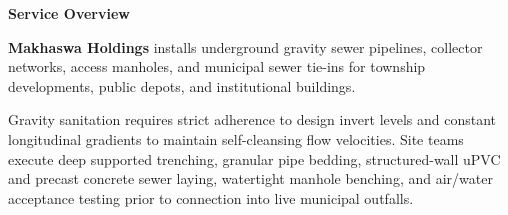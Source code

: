 \documentclass[a4paper,11pt]{article}
\begin{document}
\noindent
\begin{minipage}[t]{0.63\textwidth}
    \vspace{0pt}
    {\large\bfseries\color{mhnavy} Service Overview}
    \vspace{0.08cm}

    {\fontsize{8.7pt}{12.3pt}\selectfont\color{mhtext}
    \textbf{Makhaswa Holdings} installs underground gravity sewer pipelines, collector networks, access manholes, and municipal sewer tie-ins for township developments, public depots, and institutional buildings.
    }

    \vspace{0.15cm}

    {\fontsize{8.7pt}{12.3pt}\selectfont\color{mhtext}
    Gravity sanitation requires strict adherence to design invert levels and constant longitudinal gradients to maintain self-cleansing flow velocities. Site teams execute deep supported trenching, granular pipe bedding, structured-wall uPVC and precast concrete sewer laying, watertight manhole benching, and air/water acceptance testing prior to connection into live municipal outfalls.
    }
\end{minipage}
\hfill
\end{document}
